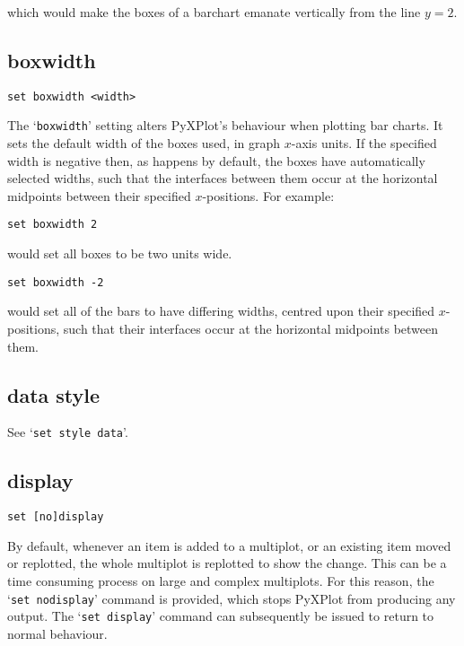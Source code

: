 \noindent which would make the boxes of a barchart emanate vertically from the line $y=2$.


\subsection{boxwidth}

\begin{verbatim}
set boxwidth <width>
\end{verbatim}

The `{\tt boxwidth}' setting alters PyXPlot's behaviour when plotting bar charts.
It sets the default width of the boxes used, in graph $x$-axis units.  If the
specified width is negative then, as happens by default, the boxes have
automatically selected widths, such that the interfaces between them occur at
the horizontal midpoints between their specified $x$-positions.  For example:

\begin{verbatim}
set boxwidth 2
\end{verbatim}

\noindent would set all boxes to be two units wide.

\begin{verbatim}
set boxwidth -2
\end{verbatim}

\noindent would set all of the bars to have differing widths, centred upon their
specified $x$-positions, such that their interfaces occur at the horizontal
midpoints between them.


\subsection{data style}

See `{\tt set style data}'.

\subsection{display}

\begin{verbatim}
set [no]display
\end{verbatim}

By default, whenever an item is added to a multiplot, or an existing item moved
or replotted, the whole multiplot is replotted to show the change. This can be
a time consuming process on large and complex multiplots. For this reason, the
`{\tt set nodisplay}' command is provided, which stops PyXPlot from producing any
output. The `{\tt set display}' command can subsequently be issued to return to
normal behaviour.

